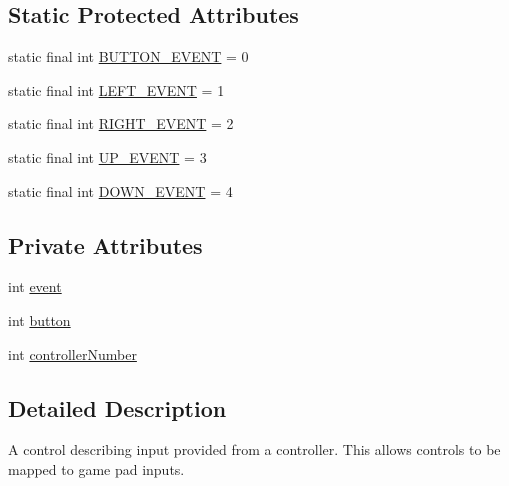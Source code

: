 \subsection*{Static Protected Attributes}
\begin{DoxyCompactItemize}
\item 
static final int \mbox{\hyperlink{classorg_1_1newdawn_1_1slick_1_1command_1_1_controller_control_a0e2e21a7d85dd11ac52ce6bba40e3260}{B\+U\+T\+T\+O\+N\+\_\+\+E\+V\+E\+NT}} = 0
\item 
static final int \mbox{\hyperlink{classorg_1_1newdawn_1_1slick_1_1command_1_1_controller_control_a6ab45f44c82328eec0129ec6449d0fd8}{L\+E\+F\+T\+\_\+\+E\+V\+E\+NT}} = 1
\item 
static final int \mbox{\hyperlink{classorg_1_1newdawn_1_1slick_1_1command_1_1_controller_control_a62b7d89e02ab3846e5a38dbd5d8da751}{R\+I\+G\+H\+T\+\_\+\+E\+V\+E\+NT}} = 2
\item 
static final int \mbox{\hyperlink{classorg_1_1newdawn_1_1slick_1_1command_1_1_controller_control_ae540186bc6a893c019894143082ed376}{U\+P\+\_\+\+E\+V\+E\+NT}} = 3
\item 
static final int \mbox{\hyperlink{classorg_1_1newdawn_1_1slick_1_1command_1_1_controller_control_a8bb2b5bc9aec486088eda6e6f925c06d}{D\+O\+W\+N\+\_\+\+E\+V\+E\+NT}} = 4
\end{DoxyCompactItemize}
\subsection*{Private Attributes}
\begin{DoxyCompactItemize}
\item 
int \mbox{\hyperlink{classorg_1_1newdawn_1_1slick_1_1command_1_1_controller_control_abd69f401973385e8f882097235fcda38}{event}}
\item 
int \mbox{\hyperlink{classorg_1_1newdawn_1_1slick_1_1command_1_1_controller_control_ad8d48f8cc2889d5360de6dc2202203f4}{button}}
\item 
int \mbox{\hyperlink{classorg_1_1newdawn_1_1slick_1_1command_1_1_controller_control_a4372c7c9a9aa160ea43f48dc27b1ad40}{controller\+Number}}
\end{DoxyCompactItemize}


\subsection{Detailed Description}
A control describing input provided from a controller. This allows controls to be mapped to game pad inputs.

